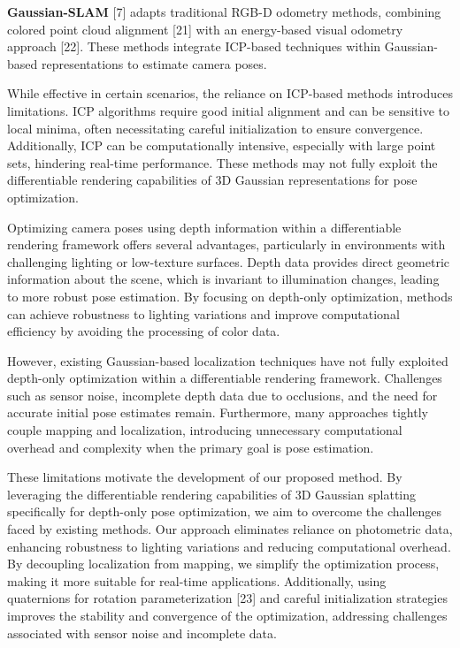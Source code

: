 \documentclass[twocolumn]{article} %
\begin{document}
\textbf{Gaussian-SLAM} {[}7{]} adapts traditional RGB-D odometry
methods, combining colored point cloud alignment {[}21{]} with an
energy-based visual odometry approach {[}22{]}. These methods integrate
ICP-based techniques within Gaussian-based representations to estimate
camera poses.

While effective in certain scenarios, the reliance on ICP-based methods
introduces limitations. ICP algorithms require good initial alignment
and can be sensitive to local minima, often necessitating careful
initialization to ensure convergence. Additionally, ICP can be
computationally intensive, especially with large point sets, hindering
real-time performance. These methods may not fully exploit the
differentiable rendering capabilities of 3D Gaussian representations for
pose optimization.

Optimizing camera poses using depth information within a differentiable
rendering framework offers several advantages, particularly in
environments with challenging lighting or low-texture surfaces. Depth
data provides direct geometric information about the scene, which is
invariant to illumination changes, leading to more robust pose
estimation. By focusing on depth-only optimization, methods can achieve
robustness to lighting variations and improve computational efficiency
by avoiding the processing of color data.

However, existing Gaussian-based localization techniques have not fully
exploited depth-only optimization within a differentiable rendering
framework. Challenges such as sensor noise, incomplete depth data due to
occlusions, and the need for accurate initial pose estimates remain.
Furthermore, many approaches tightly couple mapping and localization,
introducing unnecessary computational overhead and complexity when the
primary goal is pose estimation.

These limitations motivate the development of our proposed method. By
leveraging the differentiable rendering capabilities of 3D Gaussian
splatting specifically for depth-only pose optimization, we aim to
overcome the challenges faced by existing methods. Our approach
eliminates reliance on photometric data, enhancing robustness to
lighting variations and reducing computational overhead. By decoupling
localization from mapping, we simplify the optimization process, making
it more suitable for real-time applications. Additionally, using
quaternions for rotation parameterization {[}23{]} and careful
initialization strategies improves the stability and convergence of the
optimization, addressing challenges associated with sensor noise and
incomplete data.
\end{document}
